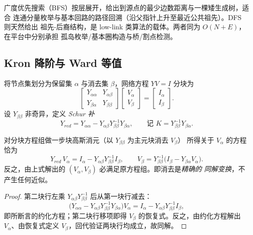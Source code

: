 \begin{remark}
广度优先搜索（BFS）按层展开，给出到源点的最少边数距离与一棵矮生成树，适合
连通分量枚举与基本回路的路径回溯（沿父指针上升至最近公共祖先）。DFS 则天然给出
祖先-后裔结构，是 low-link 类算法的载体。两者同为 $O(N+E)$，在平台中分别承担
孤岛枚举/基本圈构造与桥/割点检测。
\end{remark}

\subsection{Kron 降阶与 Ward 等值}\label{sec:gr-th-kron}

\begin{definition}
将节点集划分为保留集 $\alpha$ 与消去集 $\beta$，网络方程 $YV=I$ 分块为
\begin{equation}
\begin{bmatrix}Y_{\alpha\alpha}&Y_{\alpha\beta}\\[2pt]
Y_{\beta\alpha}&Y_{\beta\beta}\end{bmatrix}
\begin{bmatrix}V_\alpha\\V_\beta\end{bmatrix}
=
\begin{bmatrix}I_\alpha\\I_\beta\end{bmatrix}.
\end{equation}
设 $Y_{\beta\beta}$ 非奇异，定义 \emph{Schur 补}
\begin{equation}
Y_{red}=Y_{\alpha\alpha}-Y_{\alpha\beta}Y_{\beta\beta}^{-1}Y_{\beta\alpha},
\qquad\text{记 }K=Y_{\beta\beta}^{-1}Y_{\beta\alpha}.
\end{equation}
\end{definition}

\begin{theorem}\label{sec:gr-th-schur-gauss}
对分块方程组做一步块高斯消元（以 $Y_{\beta\beta}$ 为主元块消去 $V_\beta$）
所得关于 $V_\alpha$ 的方程恰为
\begin{equation}
Y_{red}\,V_\alpha=I_\alpha-Y_{\alpha\beta}Y_{\beta\beta}^{-1}I_\beta,
\qquad
V_\beta=Y_{\beta\beta}^{-1}\bigl(I_\beta-Y_{\beta\alpha}V_\alpha\bigr).
\end{equation}
反之，由上式解出的 $(V_\alpha,V_\beta)$ 必满足原方程组。即消去是\emph{精确的
同解变换}，不产生任何近似。
\end{theorem}
\begin{proof}
第二块行左乘 $Y_{\alpha\beta}Y_{\beta\beta}^{-1}$ 后从第一块行减去：
\begin{equation}
\bigl(Y_{\alpha\alpha}-Y_{\alpha\beta}Y_{\beta\beta}^{-1}Y_{\beta\alpha}\bigr)V_\alpha
=I_\alpha-Y_{\alpha\beta}Y_{\beta\beta}^{-1}I_\beta,
\end{equation}
即所断言的约化方程；第二块行移项即得 $V_\beta$ 的恢复式。反之，由约化方程解出
$V_\alpha$、由恢复式定义 $V_\beta$，回代验证两块行均成立，故同解。
\end{proof}

